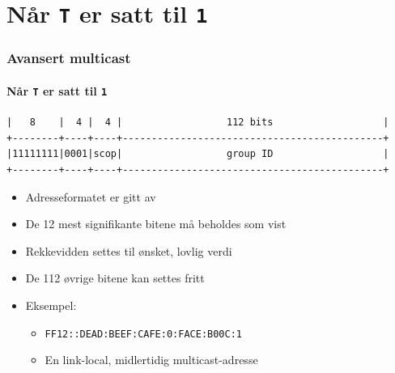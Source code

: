 \section{Når \texttt{T} er satt til \texttt{1}}
\begin{frame}[fragile]%
  \frametitle{Avansert multicast}
  \framesubtitle{Når \texttt{T} er satt til \texttt{1}}
  \pause
\begin{Verbatim}[fontsize=\tiny]
|   8    |  4 |  4 |                  112 bits                   |
+--------+----+----+---------------------------------------------+
|11111111|0001|scop|                  group ID                   |
+--------+----+----+---------------------------------------------+
\end{Verbatim}
  \pause
  \begin{itemize}[<+->]
  \item Adresseformatet er gitt av 
  \item De 12 mest signifikante bitene må beholdes som vist
  \item Rekkevidden settes til ønsket, lovlig verdi
  \item De 112 øvrige bitene kan settes fritt
  \item Eksempel:
    \begin{itemize}[<+->]
    \item \texttt{FF12::DEAD:BEEF:CAFE:0:FACE:B00C:1}
    \item En link-local, midlertidig multicast-adresse
    \end{itemize}
  \end{itemize}
\end{frame}

